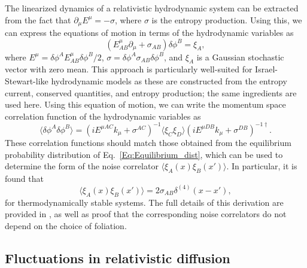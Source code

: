 \documentclass{webofc}
\begin{document}
The linearized dynamics of a relativistic hydrodynamic system can be extracted from the fact that $\partial_{\mu} E^{\mu} = -\sigma$, where $\sigma$ is the entropy production. Using this, we can express the equations of motion in terms of the hydrodynamic variables as 
\begin{equation} \label{Eq:EoM}
    \left( E_{AB}^{\mu} \partial_{\mu} + \sigma_{AB} \right) \delta \phi^B = \xi_A ,
\end{equation}
where $E^{\mu} = \delta \phi^A E_{AB}^{\mu} \delta \phi^B / 2$, $\sigma = \delta \phi^A \sigma_{AB} \delta \phi^B$, and $\xi_A$ is a Gaussian stochastic vector with zero mean. This approach is particularly well-suited for Israel-Stewart-like hydrodynamic models \cite{ISRAEL1979341} as these are constructed from the entropy current, conserved quantities, and entropy production; the same ingredients are used here. Using this equation of motion, we can write the momentum space correlation function of the hydrodynamic variables as 
\begin{equation}
    \langle \delta \phi^A \delta \phi^B \rangle = \left( i E^{\mu AC} k_{\mu} + \sigma^{AC} \right)^{-1} \langle \xi_C \xi_D \rangle \left( i E^{\mu DB} k_{\mu} + \sigma^{DB} \right)^{-1 \dagger} .
\end{equation}
These correlation functions should match those obtained from the equilibrium probability distribution of Eq.\ \eqref{Eq:Equilibrium_dist}, which can be used to determine the form of the noise correlator $\langle \xi_A(x) \xi_B(x') \rangle$. In particular, it is found that
\begin{equation} \label{Eq:noise_correlators}
    \langle \xi_A(x) \xi_B(x') \rangle = 2 \sigma_{AB} \delta^{(4)}(x-x') ,
\end{equation}
for thermodynamically stable systems. The full details of this derivation are provided in \cite{Mullins:2023tjg}, as well as proof that the corresponding noise correlators do not depend on the choice of foliation. 

\subsection{Fluctuations in relativistic diffusion}
\end{document}
